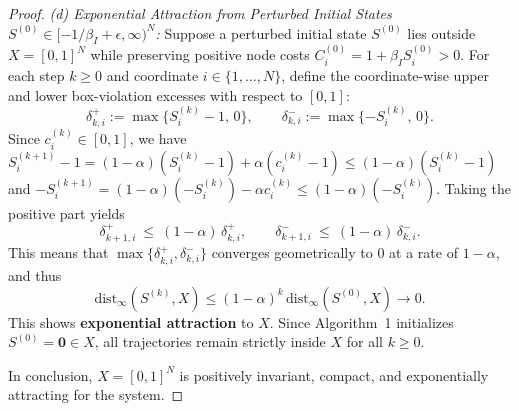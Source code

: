 \documentclass[11pt]{article}
\newcommand{\rev}[1]{#1}
\newenvironment{IEEEproof}{\begin{proof}}{\end{proof}}
\begin{document}
\begin{IEEEproof}
\rev{\textit{(d) Exponential Attraction from Perturbed Initial States $S^{(0)} \in [-1/\beta_I + \epsilon, \infty)^N$:}
Suppose a perturbed initial state $S^{(0)}$ lies outside $X=[0,1]^N$ while preserving positive node costs $C_i^{(0)} = 1 + \beta_I S_i^{(0)} > 0$. For each step $k \ge 0$ and coordinate $i \in \{1,\dots,N\}$, define the coordinate-wise upper and lower box-violation excesses with respect to $[0,1]$:
\begin{equation}
\delta^+_{k,i} := \max\{S_i^{(k)} - 1,\, 0\}, \qquad \delta^-_{k,i} := \max\{-S_i^{(k)},\, 0\}.
\end{equation}
Since $c_i^{(k)} \in [0,1]$, we have $S_i^{(k+1)} - 1 = (1-\alpha)(S_i^{(k)} - 1) + \alpha(c_i^{(k)} - 1) \le (1-\alpha)(S_i^{(k)} - 1)$ and $-S_i^{(k+1)} = (1-\alpha)(-S_i^{(k)}) - \alpha c_i^{(k)} \le (1-\alpha)(-S_i^{(k)})$. Taking the positive part yields}
\begin{equation}
\delta^+_{k+1,i}\ \le\ (1-\alpha)\,\delta^+_{k,i},\qquad 
\delta^-_{k+1,i}\ \le\ (1-\alpha)\,\delta^-_{k,i}.
\end{equation}
This means that $\max\{\delta^+_{k,i},\delta^-_{k,i}\}$ converges geometrically to $0$ at a rate of $1-\alpha$, and thus
\begin{equation}
\mathrm{dist}_\infty(S^{(k)},X) \le (1-\alpha)^k\,\mathrm{dist}_\infty(S^{(0)},X) \to 0.
\end{equation}
This shows \textbf{exponential attraction} to $X$. Since Algorithm~1 initializes $S^{(0)} = \mathbf{0} \in X$, all trajectories remain strictly inside $X$ for all $k \ge 0$.

In conclusion, $X=[0,1]^N$ is positively invariant, compact, and exponentially attracting for the system.
\end{IEEEproof}
\end{document}
